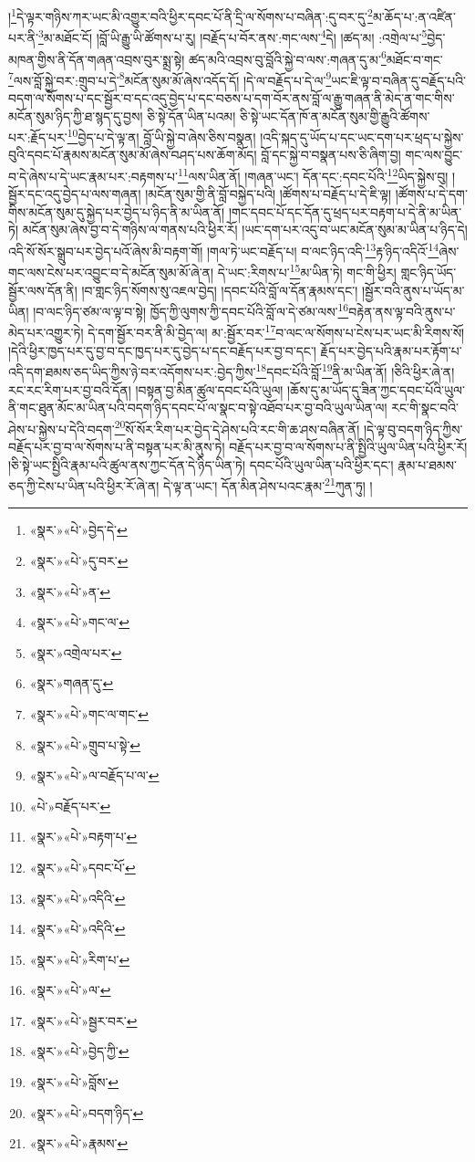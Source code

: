 །\footnote{«སྣར་»«པེ་»བྱེད་དེ་}དེ་ལྟར་གཉིས་ཀར་ཡང་མི་འགྱུར་བའི་ཕྱིར་དབང་པོ་ནི་དྲི་ལ་སོགས་པ་བཞིན་:དུ་བར་དུ་\footnote{«སྣར་»«པེ་»དུ་བར་}མ་ཆོད་པ་:ན་འཛིན་པར་ནི་\footnote{«སྣར་»«པེ་»ན་}མ་མཐོང་ངོ། །བློ་ཡི་རྒྱུ་ཡི་ཚོགས་པ་རུ། །བརྗོད་པ་བོར་ནས་:གང་ལས་\footnote{«སྣར་»«པེ་»གང་ལ་}དེ། །ཚད་མ། :འགྲེལ་པ་\footnote{«སྣར་»འགྲེལ་པར་}བྱེད་མཁན་གྱིས་ནི་དོན་གཞན་འབྲས་བུར་སྨྲ་སྟེ། ཚད་མའི་འབྲས་བུ་བློའི་སྐྱེ་བ་ལས་:གཞན་དུ་མ་\footnote{«སྣར་»གཞན་དུ་}མཐོང་བ་གང་\footnote{«སྣར་»«པེ་»གང་ལ་གང་}ལས་བློ་སྐྱེ་བར་:གྲུབ་པ་དེ་\footnote{«སྣར་»«པེ་»གྲུབ་པ་སྟེ་}མངོན་སུམ་མོ་ཞེས་འདོད་དོ། །དེ་ལ་བརྗོད་པ་དེ་ལ་\footnote{«སྣར་»«པེ་»ལ་བརྗོད་པ་ལ་}ཡང་ཇི་ལྟ་བ་བཞིན་དུ་བརྗོད་པའི་བདག་ལ་སོགས་པ་དང་སྦྱོར་བ་དང་འདུ་བྱེད་པ་དང་བཅས་པ་དག་བོར་ནས་བློ་ལ་རྒྱུ་གཞན་ནི་མེད་ན་གང་གིས་མངོན་སུམ་ཉིད་ཀྱི་ཐ་སྙད་དུ་བྱས། ཅི་སྟེ་དོན་ཡིན་པའམ། ཅི་སྟེ་ཡང་དོན་ཁོ་ན་མངོན་སུམ་གྱི་རྒྱུའི་ཚོགས་པར་:རྗོད་པར་\footnote{«པེ་»བརྗོད་པར་}བྱེད་པ་དེ་ལྟ་ན། བློ་ཡི་སྐྱེ་བ་ཞེས་ཅིས་བསྣན། །འདི་སྐད་དུ་ཡོད་པ་དང་ཡང་དག་པར་ཕྲད་པ་སྐྱེས་བུའི་དབང་པོ་རྣམས་མངོན་སུམ་མོ་ཞེས་བཤད་པས་ཆོག་མོད། བློ་དང་སྐྱེ་བ་བསྣན་པས་ཅི་ཞིག་བྱ། གང་ལས་བྱུང་བ་དེ་ཞེས་པ་དེ་ཡང་རྣམ་པར་:བརྟགས་པ་\footnote{«སྣར་»«པེ་»བརྟག་པ་}ལས་ཡིན་ནོ། །གཞན་ཡང་། དོན་དང་:དབང་པོའི་\footnote{«སྣར་»«པེ་»དབང་པོ་}ཡིད་སྐྱེས་བུ། །སྦྱོར་དང་འདུ་བྱེད་པ་ལས་གཞན། །མངོན་སུམ་གྱི་ནི་བློ་བསྐྱེད་པའི། །ཚོགས་པ་བརྗོད་པ་དེ་ཇི་ལྟ། །ཚོགས་པ་དེ་དག་གིས་མངོན་སུམ་དུ་སྐྱེད་པར་བྱེད་པ་ཉིད་ནི་མ་ཡིན་ནོ། །གང་དབང་པོ་དང་དོན་དུ་ཕྲད་པར་བརྟག་པ་དེ་ནི་མ་ཡིན་ཏེ། མངོན་སུམ་ཞེས་བྱ་བ་དེ་གཉིས་ལ་གནས་པའི་ཕྱིར་རོ། །ཡང་དག་པར་འདུ་བ་ཡང་མངོན་སུམ་མ་ཡིན་པ་ཉིད་དེ། འདི་སོ་སོར་སྒྲུབ་པར་བྱེད་པའོ་ཞེས་མི་བརྟག་གོ། །གལ་ཏེ་ཡང་བརྗོད་པ། བ་ལང་ཉིད་འདི་\footnote{«སྣར་»«པེ་»འདིའི་}རྟ་ཉིད་འདིའོ་\footnote{«སྣར་»«པེ་»འདིའི་}ཞེས་གང་ལས་ངེས་པར་འབྱུང་བ་དེ་མངོན་སུམ་མོ་ཞེ་ན། དེ་ཡང་:རིགས་པ་\footnote{«སྣར་»«པེ་»རིག་པ་}མ་ཡིན་ཏེ། གང་གི་ཕྱིར། གླང་ཉིད་ཡོད་སྦྱོར་ལས་དོན་ནི། །བ་གླང་ཉིད་སོགས་སུ་འཇལ་བྱེད། །དབང་པོའི་བློ་ལ་དོན་རྣམས་དང་། །སྦྱོར་བའི་ནུས་པ་ཡོད་མ་ཡིན། །བ་ལང་ཉིད་ཙམ་ལ་ལྟ་བ་སྟེ། ཁྱོད་ཀྱི་ལུགས་ཀྱི་དབང་པོའི་བློ་ལ་དེ་ཙམ་ལས་\footnote{«སྣར་»«པེ་»ལ་}བརྟེན་ནས་ལྟ་བའི་ནུས་པ་མེད་པར་འགྱུར་ཏེ། དེ་དག་སྦྱོར་བར་ནི་མི་བྱེད་ལ། མ་:སྦྱོར་བར་\footnote{«སྣར་»«པེ་»སྦྱར་བར་}བ་ལང་ལ་སོགས་པ་ངེས་པར་ཡང་མི་རིགས་སོ། །དེའི་ཕྱིར་ཁྱད་པར་དུ་བྱ་བ་དང་ཁྱད་པར་དུ་བྱེད་པ་དང་བརྗོད་པར་བྱ་བ་དང་། རྗོད་པར་བྱེད་པའི་རྣམ་པར་རྟོག་པ་འདི་དག་ཐམས་ཅད་ཡིད་ཀྱིས་ཉེ་བར་འདོགས་པར་:བྱེད་ཀྱིས་\footnote{«སྣར་»«པེ་»བྱེད་ཀྱི་}དབང་པོའི་བློ་\footnote{«སྣར་»«པེ་»བློས་}ནི་མ་ཡིན་ནོ། །ཅིའི་ཕྱིར་ཞེ་ན། རང་རང་རིག་པར་བྱ་བའི་དོན། །བསྟན་བྱ་མིན་ཚུལ་དབང་པོའི་ཡུལ། །ཆོས་དུ་མ་ཡོད་དུ་ཟིན་ཀྱང་དབང་པོའི་ཡུལ་ནི་གང་ཐུན་མོང་མ་ཡིན་པའི་བདག་ཉིད་དབང་པོ་ལ་སྣང་བ་སྟེ་འཐོབ་པར་བྱ་བའི་ཡུལ་ཡིན་ལ། རང་གི་སྣང་བའི་ཤེས་པ་སྐྱེས་པ་དེའི་བདག་\footnote{«སྣར་»«པེ་»བདག་ཉིད་}སོ་སོར་རིག་པར་བྱེད་དེ་ཤེས་པའི་རང་གི་ཆ་ཤས་བཞིན་ནོ། །དེ་ལྟ་བུ་བདག་ཉིད་ཀྱིས་བརྗོད་པར་བྱ་བ་ལ་སོགས་པ་ནི་བསྟན་པར་མི་ནུས་ཏེ། བརྗོད་པར་བྱ་བ་ལ་སོགས་པ་ནི་སྤྱིའི་ཡུལ་ཡིན་པའི་ཕྱིར་རོ། །ཅི་སྟེ་ཡང་སྤྱིའི་རྣམ་པའི་ཚུལ་ནས་ཀྱང་དོན་དེ་ཉིད་ཡིན་ཏེ། དབང་པོའི་ཡུལ་ཡིན་པའི་ཕྱིར་དང་། རྣམ་པ་ཐམས་ཅད་ཀྱི་ངེས་པ་ཡིན་པའི་ཕྱིར་རོ་ཞེ་ན། དེ་ལྟ་ན་ཡང་། དོན་མིན་ཤེས་པའང་རྣམ་\footnote{«སྣར་»«པེ་»རྣམས་}ཀུན་ཏུ། །
